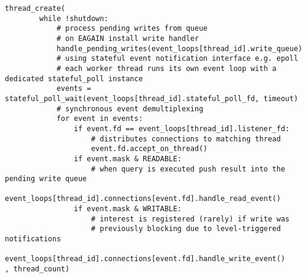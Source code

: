 \begin{lstlisting}
thread_create(
        while !shutdown:
            # process pending writes from queue
            # on EAGAIN install write handler
            handle_pending_writes(event_loops[thread_id].write_queue)
            # using stateful event notification interface e.g. epoll
            # each worker thread runs its own event loop with a dedicated stateful_poll instance
            events = stateful_poll_wait(event_loops[thread_id].stateful_poll_fd, timeout)
            # synchronous event demultiplexing
            for event in events:
                if event.fd == event_loops[thread_id].listener_fd:
                    # distributes connections to matching thread
                    event.fd.accept_on_thread()
                if event.mask & READABLE:
                    # when query is executed push result into the pending write queue
                    event_loops[thread_id].connections[event.fd].handle_read_event()
                if event.mask & WRITABLE:
                    # interest is registered (rarely) if write was
                    # previously blocking due to level-triggered notifications
                    event_loops[thread_id].connections[event.fd].handle_write_event()
, thread_count)
\end{lstlisting}